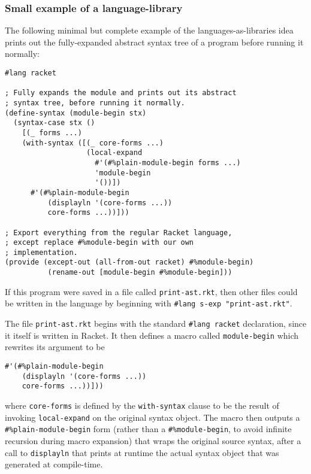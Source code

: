 \documentclass{article}
\begin{document}
\subsubsection{Small example of a language-library}
The following minimal but complete example of the languages-as-libraries idea prints out the fully-expanded abstract syntax tree of a program before running it normally:

\begin{lstlisting}
#lang racket

; Fully expands the module and prints out its abstract
; syntax tree, before running it normally.
(define-syntax (module-begin stx)
  (syntax-case stx ()
    [(_ forms ...)
    (with-syntax ([(_ core-forms ...)
                   (local-expand
                     #'(#%plain-module-begin forms ...)
                     'module-begin
                     '())])
      #'(#%plain-module-begin
          (displayln '(core-forms ...))
          core-forms ...))]))

; Export everything from the regular Racket language,
; except replace #%module-begin with our own
; implementation.
(provide (except-out (all-from-out racket) #%module-begin)
          (rename-out [module-begin #%module-begin]))
\end{lstlisting}

If this program were saved in a file called \texttt{print-ast.rkt}, then other files could be written in the language by beginning with \texttt{\#lang s-exp "print-ast.rkt"}.

The file \texttt{print-ast.rkt} begins with the standard \texttt{\#lang racket} declaration, since it itself is written in Racket. It then defines a macro called \texttt{module-begin} which rewrites its argument to be

\begin{lstlisting}
#'(#%plain-module-begin
    (displayln '(core-forms ...))
    core-forms ...))]))
\end{lstlisting}

\noindent where \texttt{core-forms} is defined by the \texttt{with-syntax} clause to be the result of invoking \texttt{local-expand} on the original syntax object. The macro then outputs a \texttt{\#\%plain-module-begin} form (rather than a \texttt{\#\%module-begin}, to avoid infinite recursion during macro expansion) that wraps the original source syntax, after a call to \texttt{displayln} that prints at runtime the actual syntax object that was generated at compile-time.
\end{document}
